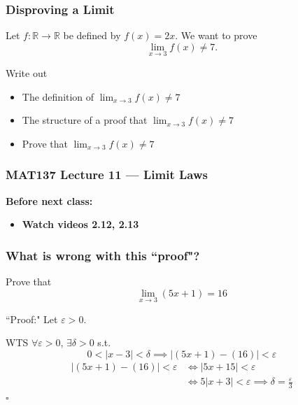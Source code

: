 \documentclass[14pt]{beamer}
\newcommand {\DS} [1] {${\displaystyle #1}$}
\newcommand{\e}{\varepsilon}
\newcommand{\p}{\pause}
\newcommand{\setsize}[1]{\fontsize{#1}{#1}\selectfont} %
\newcommand{\smallerfont}{\setsize{13}} %
\begin{document}
\begin{frame}
\frametitle{Disproving a Limit}

	Let $f:\mathbb R\to\mathbb R$ be defined by $f(x)=2x$. We want to prove
	\[
		\lim_{x\to 3} f(x)\neq 7.
	\]

	\vfill
	Write out
	\begin{itemize}
		\item The definition of \DS{\lim_{x\to 3}f(x)\neq 7}
		\item The structure of a proof that \DS{\lim_{x\to 3}f(x)\neq 7}
		\vfill\p
		\item Prove that \DS{\lim_{x\to 3}f(x)\neq 7}
	\end{itemize}

\end{frame}


\begin{frame}
\frametitle{MAT137 Lecture 11 --- Limit Laws}
	{\bf Before next class:}
		\begin{itemize} \normalsize
			\item {\bf Watch videos 2.12, 2.13 }
		\end{itemize}
	\vfill

\end{frame}

\begin{frame}
\frametitle{What is wrong with this ``proof"?}
\smallerfont
\vspace{-2mm}
\begin{block}{}%
Prove that 
$$
\lim_{x\to 3} (5x+1) = 16
$$
\end{block}

\begin{block}{``Proof:"}
	Let $\e>0$.

	WTS $\forall \e>0$, $\exists\delta>0$ s.t. 
		$$  0<|x-3|<\delta \implies |(5x+1) - (16)|<\e$$
\vspace{-3mm}
	\begin{align*}
		|(5x+1) - (16)|<\varepsilon &\iff |5x+15|<\e \\
		&\iff 5|x+3|<\e \implies\delta=\frac{\e}{3}
	\end{align*}
\hfill $\square$
\end{block}

\end{frame}
\end{document}
